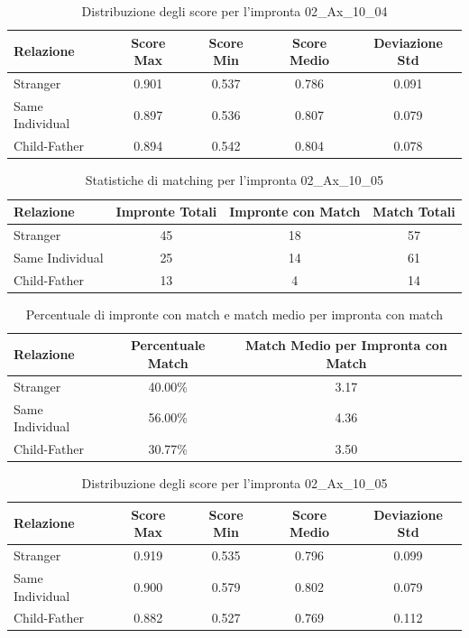 \begin{table}[htbp]
\centering
\caption{Distribuzione degli score per l'impronta 02\_Ax\_10\_04}
\label{tab:scores_02_Ax_10_04}
\begin{tabular}{|l|c|c|c|c|}
\hline
\textbf{Relazione} & \textbf{Score Max} & \textbf{Score Min} & \textbf{Score Medio} & \textbf{Deviazione Std} \\
\hline
Stranger & 0.901 & 0.537 & 0.786 & 0.091 \\
\hline
Same Individual & 0.897 & 0.536 & 0.807 & 0.079 \\
\hline
Child-Father & 0.894 & 0.542 & 0.804 & 0.078 \\
\hline
\end{tabular}
\end{table}


\begin{table}[htbp]
\centering
\caption{Statistiche di matching per l'impronta 02\_Ax\_10\_05}
\label{tab:results_02_Ax_10_05}
\begin{tabular}{|l|c|c|c|}
\hline
\textbf{Relazione} & \textbf{Impronte Totali} & \textbf{Impronte con Match} & \textbf{Match Totali} \\
\hline
Stranger & 45 & 18 & 57 \\
\hline
Same Individual & 25 & 14 & 61 \\
\hline
Child-Father & 13 & 4 & 14 \\
\hline
\end{tabular}
\end{table}


\begin{table}[htbp]
\centering
\caption{Percentuale di impronte con match e match medio per impronta con match}
\label{tab:match_percentage_02_Ax_10_05}
\begin{tabular}{|l|c|c|}
\hline
\textbf{Relazione} & \textbf{Percentuale Match} & \textbf{Match Medio per Impronta con Match} \\
\hline
Stranger & 40.00\% & 3.17 \\
\hline
Same Individual & 56.00\% & 4.36 \\
\hline
Child-Father & 30.77\% & 3.50 \\
\hline
\end{tabular}
\end{table}


\begin{table}[htbp]
\centering
\caption{Distribuzione degli score per l'impronta 02\_Ax\_10\_05}
\label{tab:scores_02_Ax_10_05}
\begin{tabular}{|l|c|c|c|c|}
\hline
\textbf{Relazione} & \textbf{Score Max} & \textbf{Score Min} & \textbf{Score Medio} & \textbf{Deviazione Std} \\
\hline
Stranger & 0.919 & 0.535 & 0.796 & 0.099 \\
\hline
Same Individual & 0.900 & 0.579 & 0.802 & 0.079 \\
\hline
Child-Father & 0.882 & 0.527 & 0.769 & 0.112 \\
\hline
\end{tabular}
\end{table}


